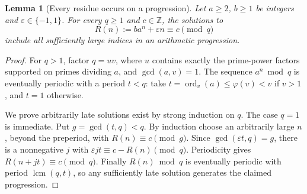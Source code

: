 \documentclass[11pt,a4paper]{article}
\numberwithin{equation}{section}
\newtheorem{lemma}[theorem]{Lemma}
\theoremstyle{definition}
\theoremstyle{remark}
\begin{document}
\begin{lemma}[Every residue occurs on a progression]\label{exm:residues}
Let \(a\ge2\), \(b\ge1\) be integers and
\(\varepsilon\in\{-1,1\}\). For every \(q\ge1\) and \(c\in\mathbb Z\),
the solutions to
\[
 R(n):=ba^n+\varepsilon n\equiv c\pmod q
\]
include all sufficiently large indices in an arithmetic
progression.
\end{lemma}
\begin{proof}
For \(q>1\), factor \(q=uv\), where \(u\) contains exactly
the prime-power factors supported on primes dividing \(a\),
and \(\gcd(a,v)=1\). The sequence \(a^n\bmod q\) is
eventually periodic with a period \(t<q\): take
\(t=\operatorname{ord}_v(a)\le\varphi(v)<v\) if \(v>1\),
and \(t=1\) otherwise.

We prove arbitrarily late solutions exist by strong induction
on \(q\). The case \(q=1\) is immediate. Put
\(g=\gcd(t,q)<q\). By induction choose an arbitrarily
large \(n\), beyond the preperiod, with \(R(n)\equiv c\pmod g\).
Since \(\gcd(\varepsilon t,q)=g\), there is a nonnegative
\(j\) with \(\varepsilon jt\equiv c-R(n)\pmod q\).
Periodicity gives \(R(n+jt)\equiv c\pmod q\).
Finally \(R(n)\bmod q\) is eventually periodic with period
\(\operatorname{lcm}(q,t)\), so any sufficiently late solution
generates the claimed progression.
\end{proof}
\end{document}
